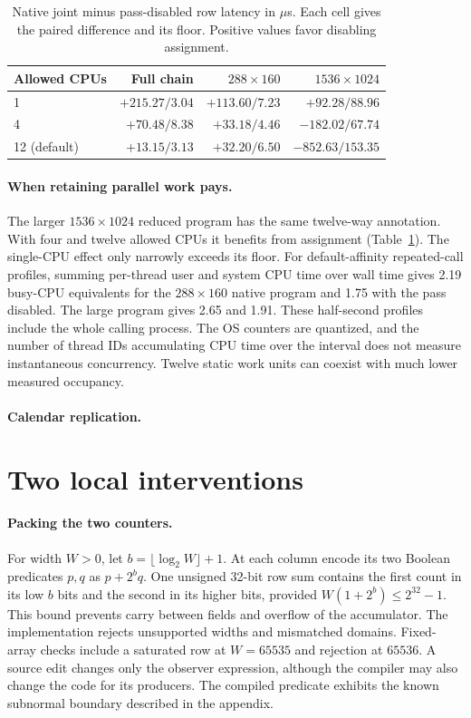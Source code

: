 \documentclass[sigplan,10pt,review,anonymous,nonacm]{acmart}
\begin{document}
\begin{table}[t]
\caption{Native joint minus pass-disabled row latency in \(\mu\)s. Each cell gives the paired difference and its floor. Positive values favor disabling assignment.}
\label{tab:scale}
\centering\small
\begin{tabular}{@{}lrrr@{}}\toprule
Allowed CPUs & Full chain & $288\times160$ & $1536\times1024$\\\midrule
1 & $+215.27/3.04$ & $+113.60/7.23$ & $+92.28/88.96$\\
4 & $+70.48/8.38$ & $+33.18/4.46$ & $-182.02/67.74$\\
12 (default) & $+13.15/3.13$ & $+32.20/6.50$ & $-852.63/153.35$\\\bottomrule
\end{tabular}
\end{table}

\paragraph{When retaining parallel work pays.}
The larger $1536\times1024$ reduced program has the same twelve-way annotation. With four and twelve allowed CPUs it benefits from assignment (Table~\ref{tab:scale}). The single-CPU effect only narrowly exceeds its floor. For default-affinity repeated-call profiles, summing per-thread user and system CPU time over wall time gives 2.19 busy-CPU equivalents for the $288\times160$ native program and 1.75 with the pass disabled. The large program gives 2.65 and 1.91. These half-second profiles include the whole calling process. The OS counters are quantized, and the number of thread IDs accumulating CPU time over the interval does not measure instantaneous concurrency. Twelve static work units can coexist with much lower measured occupancy.

\paragraph{Calendar replication.}


\section{Two local interventions}
\paragraph{Packing the two counters.}
For width $W>0$, let $b=\lfloor\log_2 W\rfloor+1$. At each column encode its two Boolean predicates $p,q$ as $p+2^bq$. One unsigned 32-bit row sum contains the first count in its low $b$ bits and the second in its higher bits, provided $W(1+2^b)\leq2^{32}-1$. This bound prevents carry between fields and overflow of the accumulator. The implementation rejects unsupported widths and mismatched domains. Fixed-array checks include a saturated row at $W=65535$ and rejection at $65536$. A source edit changes only the observer expression, although the compiler may also change the code for its producers. The compiled predicate exhibits the known subnormal boundary described in the appendix.
\end{document}
